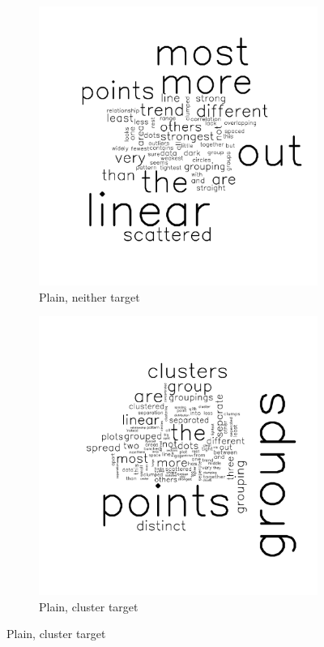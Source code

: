 \documentclass[11pt]{isuthesis}\usepackage[]{graphicx}\usepackage[]{color}
\begin{document}
\begin{figure}[ht]\centering


\centering
\begin{subfigure}[t]{0.25\linewidth}
  \caption{Plain, neither target}
  \includegraphics[width=\linewidth]{fig-sentiment-1}
\end{subfigure}
\begin{subfigure}[t]{0.25\linewidth}
  \caption{Plain, cluster target}
  \includegraphics[width=\linewidth]{fig-sentiment-2}

\end{subfigure}
\end{figure}
\end{document}
